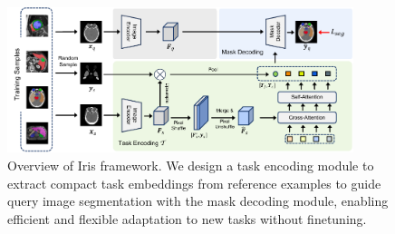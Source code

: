 \begin{figure}[t]
\begin{center}
\includegraphics[width=0.9\textwidth]{./fig/framework.pdf}
\end{center}
\vspace{-1em}
\caption{Overview of Iris framework. We design a task encoding module to extract compact task embeddings from reference examples to guide query image segmentation with the mask decoding module, enabling efficient and flexible adaptation to new tasks without finetuning.}
\label{fig:framework}
\vspace{-1em}
\end{figure}



